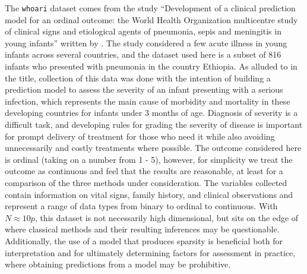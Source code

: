 The \texttt{whoari} dataset comes from the study ``Development of a clinical prediction model for an ordinal outcome: the World Health Organization multicentre study of clinical signs and etiological agents of pneumonia, sepis and meningitis in young infants'' written by \cite{Harrell1998}. The study considered a few acute illness in young infants across several countries, and the dataset used here is a subset of 816 infants who presented with pneumonia in the country Ethiopia. As alluded to in the title, collection of this data was done with the intention of building a prediction model to assess the severity of an infant presenting with a serious infection, which represents the main cause of morbidity and mortality in these developing countries for infants under 3 months of age. Diagnosis of severity is a difficult task, and developing rules for grading the severity of disease is important for prompt delivery of treatment for those who need it while also avoiding unnecessarily and costly treatments where possible. The outcome considered here is ordinal (taking on a number from 1 - 5), however, for simplicity we treat the outcome as continuous and feel that the results are reasonable, at least for a comparison of the three methods under consideration. The variables collected contain information on vital signs, family history, and clinical observations and represent a range of data types from binary to ordinal to continuous. With $N \approx 10p$, this dataset is not necessarily high dimensional, but sits on the edge of where classical methods and their resulting inferences may be questionable. Additionally, the use of a model that produces sparsity is beneficial both for interpretation and for ultimately determining factors for assessment in practice, where obtaining predictions from a model may be prohibitive.

